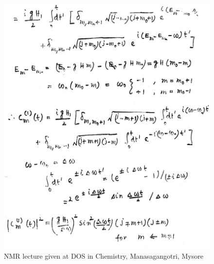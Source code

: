 \begin{figure}[H]
\centering
\includegraphics[scale=0.48]{src/images/chap8/5.eps}
\caption{NMR lecture given at DOS in Chemistry, Manasagangotri, Mysore}
\end{figure}
